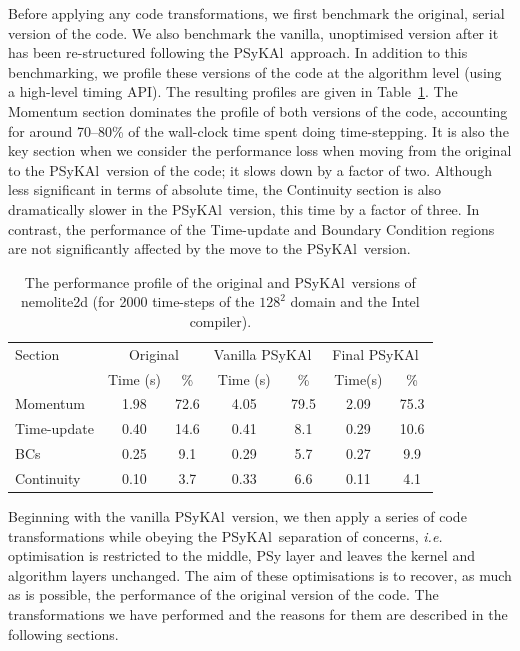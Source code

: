 \documentclass[journal]{IEEEtran}
\newcommand{\psykal}{{PS}y{KA}l\ }
\begin{document}
Before applying any code transformations, we first benchmark the
original, serial version of the code. We also benchmark the vanilla,
unoptimised version after it has been re-structured following the
\psykal approach. In addition to this benchmarking, we profile these
versions of the code at the algorithm level (using a high-level timing
API). The resulting profiles are given in
Table~\ref{TABLE_profile}. The Momentum section dominates the profile
of both versions of the code, accounting for around 70--80\% of the
wall-clock time spent doing time-stepping. It is also the key section
when we consider the performance loss when moving from the original to
the \psykal version of the code; it slows down by a factor of
two. Although less significant in terms of absolute time, the
Continuity section is also dramatically slower in the \psykal version,
this time by a factor of three. In contrast, the performance of the
Time-update and Boundary Condition regions are not significantly
affected by the move to the \psykal version.

\begin{table}[!t]
\caption{The performance profile of the original and \psykal versions
  of nemolite2d (for 2000 time-steps of the $128^{2}$ domain and the
  Intel compiler).}
\label{TABLE_profile}
\centering
\begin{tabular}{l|c|c|c|c|c|c}
\hline
Section & \multicolumn{2}{c|}{Original} & \multicolumn{2}{c|}{Vanilla \psykal} &
\multicolumn{2}{c}{Final \psykal} \\
        & Time (s) & \%  & Time (s) & \%  & Time(s) & \% \\
\hline
Momentum    & 1.98  & 72.6  & 4.05  & 79.5 & 2.09 & 75.3 \\
Time-update & 0.40  & 14.6  & 0.41  & 8.1  & 0.29 & 10.6 \\
BCs         & 0.25  & 9.1   & 0.29  & 5.7  & 0.27 & 9.9  \\
Continuity  & 0.10  & 3.7   & 0.33  & 6.6  & 0.11 & 4.1  \\
\hline
\end{tabular}
\end{table}

Beginning with the vanilla \psykal version, we then apply a series of
code transformations while obeying the \psykal separation of concerns,
{\it i.e.} optimisation is restricted to the middle, {PS}y layer and
leaves the kernel and algorithm layers unchanged. The aim of these
optimisations is to recover, as much as is possible, the performance
of the original version of the code. The transformations we have
performed and the reasons for them are described in the following sections.
\end{document}
